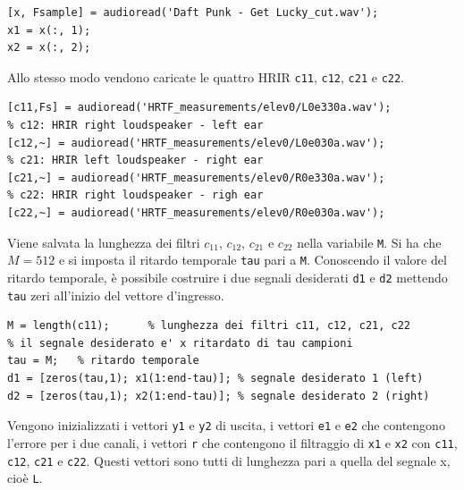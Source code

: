 \documentclass[12pt,a4paper,titlepage]{article}
\begin{document}
\begin{lstlisting}[label=code:caricamento_audio_lms, caption=Caricamento del file audio, captionpos=b]
[x, Fsample] = audioread('Daft Punk - Get Lucky_cut.wav');
x1 = x(:, 1);
x2 = x(:, 2);
\end{lstlisting}

Allo stesso modo vendono caricate le quattro HRIR \texttt{c11}, \texttt{c12}, \texttt{c21} e \texttt{c22}.

\begin{lstlisting}[label=code:caricamento_hrir_lms, caption=Caricamento delle HRIR, captionpos=b]
% c11: HRIR left loudspeaker - left ear
[c11,Fs] = audioread('HRTF_measurements/elev0/L0e330a.wav'); 
% c12: HRIR right loudspeaker - left ear
[c12,~] = audioread('HRTF_measurements/elev0/L0e030a.wav');     
% c21: HRIR left loudspeaker - right ear
[c21,~] = audioread('HRTF_measurements/elev0/R0e330a.wav');    
% c22: HRIR right loudspeaker - righ ear
[c22,~] = audioread('HRTF_measurements/elev0/R0e030a.wav');  
\end{lstlisting}

Viene salvata la lunghezza dei filtri $c_{11}$, $c_{12}$, $c_{21}$ e $c_{22}$ nella variabile \texttt{M}. Si ha che $M = 512$ e si imposta il ritardo temporale \texttt{tau} pari a \texttt{M}. Conoscendo il valore del ritardo temporale, è possibile costruire i due segnali desiderati \texttt{d1} e \texttt{d2} mettendo \texttt{tau} zeri all'inizio del vettore d'ingresso.

\begin{lstlisting}[label=code:segnale_desiderato_lms, caption=Costruzione del segnale desiderato, captionpos=b]
M = length(c11);      % lunghezza dei filtri c11, c12, c21, c22
% il segnale desiderato e' x ritardato di tau campioni
tau = M;   % ritardo temporale
d1 = [zeros(tau,1); x1(1:end-tau)]; % segnale desiderato 1 (left)
d2 = [zeros(tau,1); x2(1:end-tau)]; % segnale desiderato 2 (right)
\end{lstlisting}

Vengono inizializzati i vettori \texttt{y1} e \texttt{y2} di uscita, i vettori \texttt{e1} e \texttt{e2} che contengono l'errore per i due canali, i vettori \texttt{r} che contengono il filtraggio di \texttt{x1} e \texttt{x2} con \texttt{c11}, \texttt{c12}, \texttt{c21} e \texttt{c22}. Questi vettori sono tutti di lunghezza pari a quella del segnale x, cioè \texttt{L}.
\end{document}
